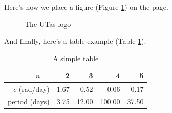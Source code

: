 Here's how we place a figure (Figure \ref{fig:utas}) on the page.
\begin{figure}[hbtp]
\begin{center}
 \caption{
\label{fig:utas} The UTas logo}
\end{center}
\end{figure}

And finally, here's a table example (Table \ref{tab:taba}).
\begin{table}[hbtp]
\begin{center}
\begin{tabular}{|r|r|r|r|r|}
\hline
$n=$&2&3&4&5\\
\hline
$c$ (rad/day)&1.67&0.52&0.06&-0.17\\
\hline
period (days)&3.75&12.00&100.00&37.50\\
\hline
\end{tabular}
\end{center}
\caption{\label{tab:taba}A simple table}
\end{table}
